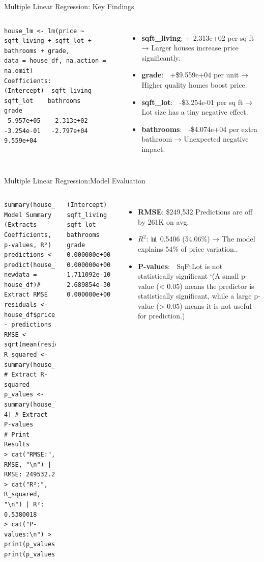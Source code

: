 \documentclass{beamer}
\begin{document}
\begin{frame}[fragile]{Multiple Linear Regression: Key Findings}
	\begin{columns}
		\begin{lstlisting}
house_lm <- lm(price ~ sqft_living + sqft_lot + bathrooms + grade, 
data = house_df, na.action = na.omit)
Coefficients:
(Intercept)  sqft_living     sqft_lot    bathrooms        grade  
-5.957e+05    2.313e+02   -3.254e-01   -2.797e+04    9.559e+04  
		\end{lstlisting}
		\begin{itemize}
			\item \textbf{sqft\_living}: +\🏡 2.313e+02 per sq ft → Larger houses increase price significantly.
			\item \textbf{grade}: 🔼 +\$9.559e+04 per unit → Higher quality homes boost price.
			\item \textbf{sqft\_lot}: 🌲 -\$3.254e-01 per sq ft → Lot size has a tiny negative effect.
			\item \textbf{bathrooms}: 🚿 -\$4.074e+04 per extra bathroom → Unexpected negative impact.
		\end{itemize}
	\end{columns}
\end{frame}

\begin{frame}[fragile]{Multiple Linear Regression:Model Evaluation}
	\begin{columns}
		\column{0.9\textwidth}
		\begin{lstlisting}
summary(house_lm)# Model Summary (Extracts Coefficients, p-values, R²)
predictions <- predict(house_lm, newdata = house_df)# Extract RMSE
residuals <- house_df$price - predictions
RMSE <- sqrt(mean(residuals^2))
R_squared <- summary(house_lm)$r.squared # Extract R-squared
p_values <- summary(house_lm)$coefficients[, 4] # Extract P-values
# Print Results
> cat("RMSE:", RMSE, "\n") | RMSE: 249532.2 
> cat("R²:", R_squared, "\n") | R²: 0.5380018 
> cat("P-values:\n") > print(p_values)
print(p_values)
		\end{lstlisting}
		\begin{lstlisting}
(Intercept)  sqft_living     sqft_lot    bathrooms        grade 
0.000000e+00 0.000000e+00 1.711092e-10 2.689854e-30 0.000000e+00 
		\end{lstlisting}
		\begin{itemize}
			\item \textbf{RMSE}:  \$249,532 Predictions are off by 261K on avg.
			\item \textbf{$R^2$}: 📊 0.5406 (54.06\%) → The model explains 54\% of price variation..
			\item \textbf{P-values}: 🧪 SqFtLot is not statistically significant `(A small p-value (< 0.05) means the predictor is statistically significant, while a large p-value (> 0.05) means it is not useful for prediction.)
		\end{itemize}
	\end{columns}
\end{frame}
\end{document}
